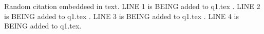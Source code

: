 \documentclass{article}
\begin{document}
Random citation \cite{DUMMY:1} embeddeed in text.
LINE 1 is BEING added to q1.tex .\linebreak
LINE 2 is BEING added to q1.tex .\linebreak
LINE 3 is BEING added to q1.tex .\linebreak
LINE 4 is BEING added to q1.tex.

\newpage

 

\end{document}
